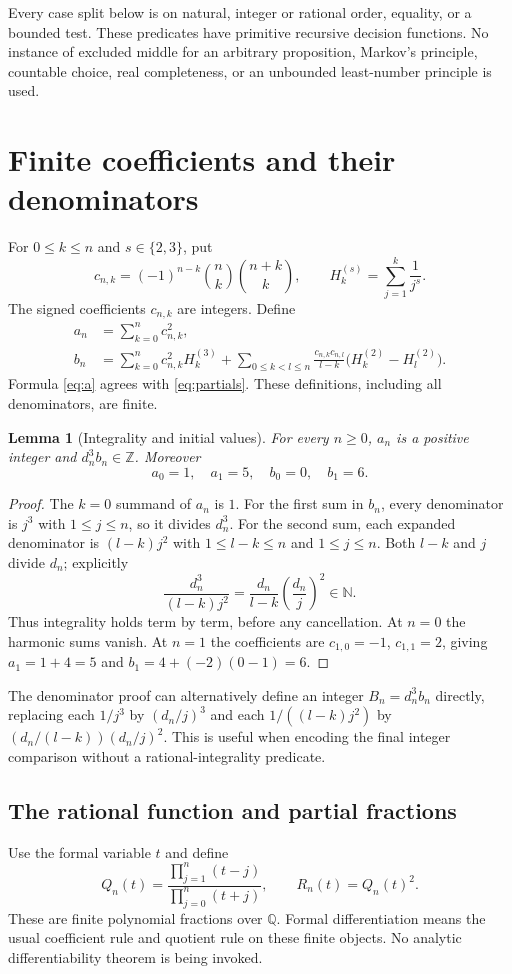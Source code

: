 \documentclass[11pt]{article}
\newtheorem{lemma}[theorem]{Lemma}
\theoremstyle{definition}\newtheorem{definition}[theorem]{Definition}
\theoremstyle{remark}\newtheorem{remark}[theorem]{Remark}
\newcommand{\N}{\mathbb N}\newcommand{\Z}{\mathbb Z}\newcommand{\Q}{\mathbb Q}
\newcommand{\HH}[2]{H_{#1}^{(#2)}}
\begin{document}
Every case split below is on natural, integer or rational order, equality,
or a bounded test. These predicates have primitive recursive decision
functions. No instance of excluded middle for an arbitrary proposition,
Markov's principle, countable choice, real completeness, or an unbounded
least-number principle is used.

\section{Finite coefficients and their denominators}\label{sec:coeff}
For $0\le k\le n$ and $s\in\{2,3\}$, put
\[
 c_{n,k}=(-1)^{n-k}\binom nk\binom{n+k}{k},\qquad
 \HH{k}{s}=\sum_{j=1}^{k}\frac1{j^s}.
\]
The signed coefficients $c_{n,k}$ are integers. Define
\begin{align}
 a_n&=\sum_{k=0}^{n}c_{n,k}^2,\label{eq:a}\\
 b_n&=\sum_{k=0}^{n}c_{n,k}^2\HH{k}{3}
 +\sum_{0\le k<l\le n}\frac{c_{n,k}c_{n,l}}{l-k}
       \bigl(\HH{k}{2}-\HH{l}{2}\bigr).\label{eq:b}
\end{align}
Formula \eqref{eq:a} agrees with \eqref{eq:partials}. These definitions,
including all denominators, are finite.

\begin{lemma}[Integrality and initial values]\label{lem:integrality}
For every $n\ge0$, $a_n$ is a positive integer and $d_n^3b_n\in\Z$.
Moreover
\[
 a_0=1,\quad a_1=5,\quad b_0=0,\quad b_1=6.
\]
\end{lemma}
\begin{proof}
The $k=0$ summand of $a_n$ is $1$. For the first sum in $b_n$, every
denominator is $j^3$ with $1\le j\le n$, so it divides $d_n^3$.
For the second sum, each expanded denominator is $(l-k)j^2$ with
$1\le l-k\le n$ and $1\le j\le n$. Both $l-k$ and $j$ divide $d_n$;
explicitly
\[
 \frac{d_n^3}{(l-k)j^2}=\frac{d_n}{l-k}\left(\frac{d_n}{j}\right)^2\in\N.
\]
Thus integrality holds term by term, before any cancellation.
At $n=0$ the harmonic sums vanish. At $n=1$ the coefficients are
$c_{1,0}=-1$, $c_{1,1}=2$, giving $a_1=1+4=5$ and
$b_1=4+(-2)(0-1)=6$.
\end{proof}

The denominator proof can alternatively define an integer $B_n=d_n^3b_n$
directly, replacing each $1/j^3$ by $(d_n/j)^3$ and each
$1/((l-k)j^2)$ by $(d_n/(l-k))(d_n/j)^2$. This is useful when encoding the
final integer comparison without a rational-integrality predicate.

\subsection{The rational function and partial fractions}
Use the formal variable $t$ and define
\begin{equation}\label{eq:R}
 Q_n(t)=\frac{\prod_{j=1}^{n}(t-j)}{\prod_{j=0}^{n}(t+j)},\qquad
 R_n(t)=Q_n(t)^2.
\end{equation}
These are finite polynomial fractions over $\Q$. Formal differentiation
means the usual coefficient rule and quotient rule on these finite objects.
No analytic differentiability theorem is being invoked.
\end{document}
